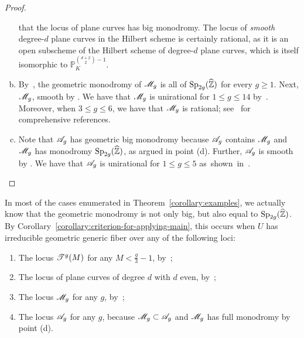 \begin{proof}
\begin{enumerate}[(a)]
that the locus of plane curves has big monodromy.
The locus of \emph{smooth} degree-$d$ plane curves in the Hilbert scheme
is certainly rational,
       as it is an open subscheme of the Hilbert scheme of degree-$d$ plane curves, which is itself isomorphic to $\mathbb P_K^{\binom{d+2}{2}-1}$.
\item By~\cite[5.12]{deligne1969irreducibility}, the geometric monodromy of ${\mathscr M_g}$ is all of $\operatorname{Sp}_{2g}(\widehat {\mathbb Z})$ for every $g \geq 1$. 	Next, ${\mathscr M_g}$, smooth by \cite[Theorem 5.2]{deligne1969irreducibility}. We have that ${\mathscr M_g}$ is unirational for $1 \leq g \leq 14$ by~\cite{verra2005unirationality}. Moreover, when $3 \leq g \leq 6$, we have that ${\mathscr M_g}$ is rational; see~\cite[p.~2]{casnati2007rationality} for comprehensive references.
\item Note that ${\mathscr A_g}$ has geometric big monodromy because ${\mathscr A_g}$ contains ${\mathscr M_g}$ and ${\mathscr M_g}$ has monodromy $\operatorname{Sp}_{2g}(\widehat {\mathbb Z})$, as argued in point (d).
Further,
		       ${\mathscr A_g}$ is smooth by \cite[Theorem 2.4.1]{oort:finite-group-schemes-local-moduli-for-abelian-varieties-and-lifting-problems}.
	We have that ${\mathscr A_g}$ is unirational for $1 \leq g \leq 5$ \mbox{as shown in~\cite[p.~1]{verra2005unirationality}.}\qedhere
\end{enumerate}
\end{proof}

\begin{remark}
       \label{remark:mmmm}
       In most of the cases enumerated in Theorem~\ref{corollary:examples}, we actually know that the geometric monodromy is not only big, but also equal to $\operatorname{Sp}_{2g}(\widehat{\mathbb Z})$.
       By Corollary~\ref{corollary:criterion-for-applying-main},
       this occurs when $U$ has irreducible geometric generic fiber
       over any of the following loci:
       \begin{enumerate}
               \item The locus $\mathscr T^{g} (M)$ for any $M < \frac{g}{3}-1$, by~\cite[Theorem, p.~2]{bolognesi2016mapping};
               \item The locus of plane curves of degree $d$ with $d$ even, by~\cite[Theoreme 4(i)]{beauville1986groupe};
               \item The locus ${\mathscr M_g}$ for any $g$, by~\cite[5.12]{deligne1969irreducibility};
	       \item The locus ${\mathscr A_g}$ for any $g$, because ${\mathscr M_g} \subset {\mathscr A_g}$ and ${\mathscr M_g}$ has full monodromy by point (d).
       \end{enumerate}
\end{remark}

